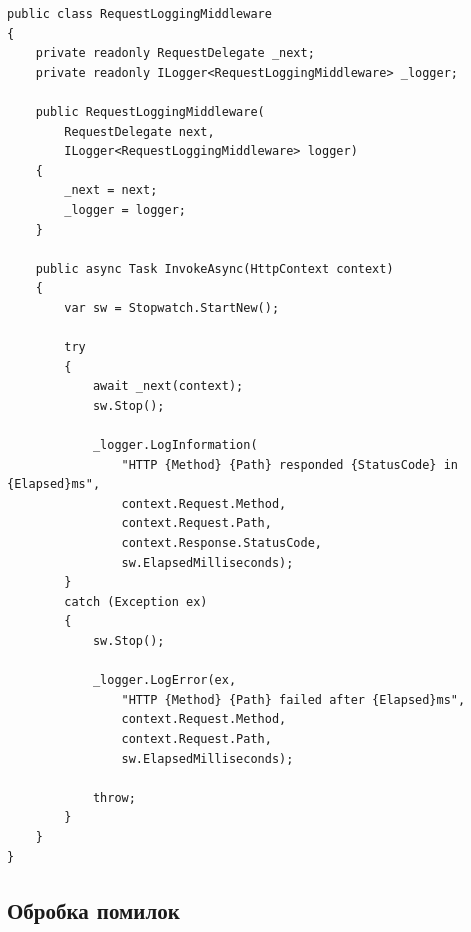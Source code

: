 \documentclass[14pt,a4paper]{extarticle}
\begin{document}
\begin{lstlisting}[language={[Sharp]C}, caption=Middleware для логування запитів, basicstyle=\small\ttfamily, breaklines=true, frame=single]
public class RequestLoggingMiddleware
{
    private readonly RequestDelegate _next;
    private readonly ILogger<RequestLoggingMiddleware> _logger;
    
    public RequestLoggingMiddleware(
        RequestDelegate next,
        ILogger<RequestLoggingMiddleware> logger)
    {
        _next = next;
        _logger = logger;
    }
    
    public async Task InvokeAsync(HttpContext context)
    {
        var sw = Stopwatch.StartNew();
        
        try
        {
            await _next(context);
            sw.Stop();
            
            _logger.LogInformation(
                "HTTP {Method} {Path} responded {StatusCode} in {Elapsed}ms",
                context.Request.Method,
                context.Request.Path,
                context.Response.StatusCode,
                sw.ElapsedMilliseconds);
        }
        catch (Exception ex)
        {
            sw.Stop();
            
            _logger.LogError(ex,
                "HTTP {Method} {Path} failed after {Elapsed}ms",
                context.Request.Method,
                context.Request.Path,
                sw.ElapsedMilliseconds);
                
            throw;
        }
    }
}
\end{lstlisting}

\newpage
\subsection{Обробка помилок}
\end{document}
